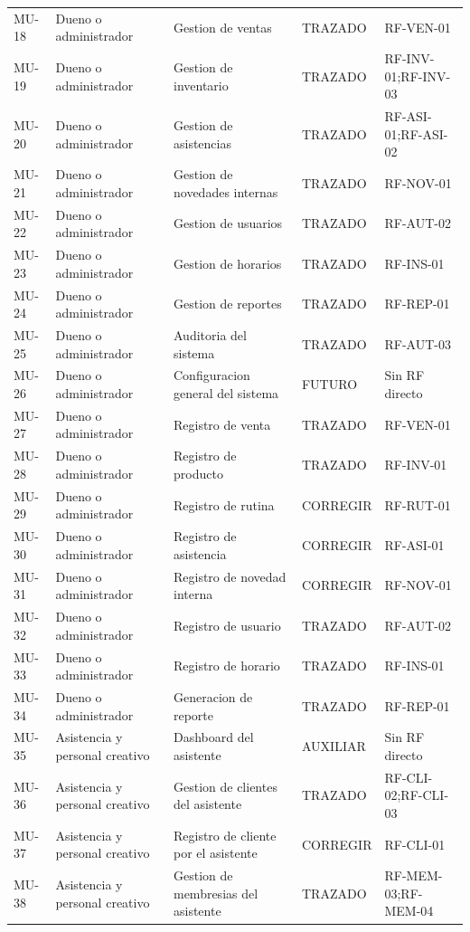 \documentclass[11pt,a4paper,twoside]{article}
\begin{document}
\begin{longtable}{p{1.0cm}p{2.7cm}p{3.0cm}p{3.1cm}p{2.8cm}}
MU-18 & Dueno o administrador & Gestion de ventas & TRAZADO & RF-VEN-01 \\
MU-19 & Dueno o administrador & Gestion de inventario & TRAZADO & RF-INV-01;RF-INV-03 \\
MU-20 & Dueno o administrador & Gestion de asistencias & TRAZADO & RF-ASI-01;RF-ASI-02 \\
MU-21 & Dueno o administrador & Gestion de novedades internas & TRAZADO & RF-NOV-01 \\
MU-22 & Dueno o administrador & Gestion de usuarios & TRAZADO & RF-AUT-02 \\
MU-23 & Dueno o administrador & Gestion de horarios & TRAZADO & RF-INS-01 \\
MU-24 & Dueno o administrador & Gestion de reportes & TRAZADO & RF-REP-01 \\
MU-25 & Dueno o administrador & Auditoria del sistema & TRAZADO & RF-AUT-03 \\
MU-26 & Dueno o administrador & Configuracion general del sistema & FUTURO & Sin RF directo \\
MU-27 & Dueno o administrador & Registro de venta & TRAZADO & RF-VEN-01 \\
MU-28 & Dueno o administrador & Registro de producto & TRAZADO & RF-INV-01 \\
MU-29 & Dueno o administrador & Registro de rutina & CORREGIR & RF-RUT-01 \\
MU-30 & Dueno o administrador & Registro de asistencia & CORREGIR & RF-ASI-01 \\
MU-31 & Dueno o administrador & Registro de novedad interna & CORREGIR & RF-NOV-01 \\
MU-32 & Dueno o administrador & Registro de usuario & TRAZADO & RF-AUT-02 \\
MU-33 & Dueno o administrador & Registro de horario & TRAZADO & RF-INS-01 \\
MU-34 & Dueno o administrador & Generacion de reporte & TRAZADO & RF-REP-01 \\
MU-35 & Asistencia y personal creativo & Dashboard del asistente & AUXILIAR & Sin RF directo \\
MU-36 & Asistencia y personal creativo & Gestion de clientes del asistente & TRAZADO & RF-CLI-02;RF-CLI-03 \\
MU-37 & Asistencia y personal creativo & Registro de cliente por el asistente & CORREGIR & RF-CLI-01 \\
MU-38 & Asistencia y personal creativo & Gestion de membresias del asistente & TRAZADO & RF-MEM-03;RF-MEM-04 \\

\end{longtable}
\end{document}
